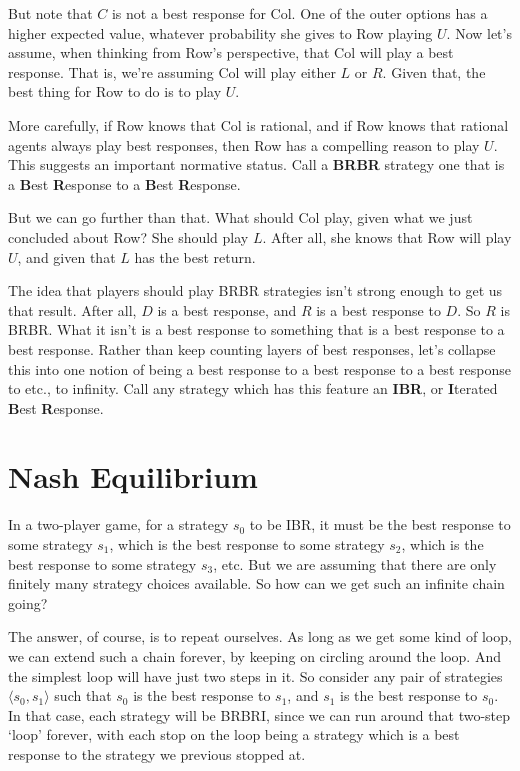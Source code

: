 \documentclass[
  11pt,
  letterpaper,
]{scrbook}
\begin{document}
But note that \(C\) is not a best response for Col. One of the outer
options has a higher expected value, whatever probability she gives to
Row playing \(U\). Now let's assume, when thinking from Row's
perspective, that Col will play a best response. That is, we're assuming
Col will play either \(L\) or \(R\). Given that, the best thing for Row
to do is to play \(U\).

More carefully, if Row knows that Col is rational, and if Row knows that
rational agents always play best responses, then Row has a compelling
reason to play \(U\). This suggests an important normative status. Call
a \textbf{BRBR} strategy one that is a \textbf{B}est \textbf{R}esponse
to a \textbf{B}est \textbf{R}esponse.

But we can go further than that. What should Col play, given what we
just concluded about Row? She should play \(L\). After all, she knows
that Row will play \(U\), and given that \(L\) has the best return.

The idea that players should play BRBR strategies isn't strong enough to
get us that result. After all, \(D\) is a best response, and \(R\) is a
best response to \(D\). So \(R\) is BRBR. What it isn't is a best
response to something that is a best response to a best response. Rather
than keep counting layers of best responses, let's collapse this into
one notion of being a best response to a best response to a best
response to etc., to infinity. Call any strategy which has this feature
an \textbf{IBR}, or \textbf{I}terated \textbf{B}est \textbf{R}esponse.

\section{Nash Equilibrium}\label{sec-nash-equilibrium}

In a two-player game, for a strategy \(s_0\) to be IBR, it must be the
best response to some strategy \(s_1\), which is the best response to
some strategy \(s_2\), which is the best response to some strategy
\(s_3\), etc. But we are assuming that there are only finitely many
strategy choices available. So how can we get such an infinite chain
going?

The answer, of course, is to repeat ourselves. As long as we get some
kind of loop, we can extend such a chain forever, by keeping on circling
around the loop. And the simplest loop will have just two steps in it.
So consider any pair of strategies \(\langle s_0, s_1 \rangle\) such
that \(s_0\) is the best response to \(s_1\), and \(s_1\) is the best
response to \(s_0\). In that case, each strategy will be BRBRI, since we
can run around that two-step `loop' forever, with each stop on the loop
being a strategy which is a best response to the strategy we previous
stopped at.
\end{document}
